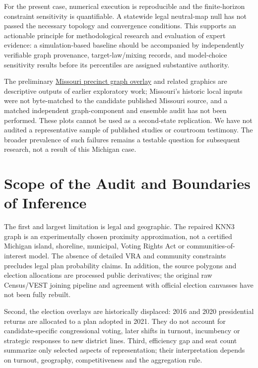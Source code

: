 \documentclass[
  10pt,
]{article}
\begin{document}
For the present case, numerical execution is reproducible and the
finite-horizon constraint sensitivity is quantifiable. A statewide legal
neutral-map null has not passed the necessary topology and convergence
conditions. This supports an actionable principle for methodological
research and evaluation of expert evidence: a simulation-based baseline
should be accompanied by independently verifiable graph provenance,
target-law/mixing records, and model-choice sensitivity results before
its percentiles are assigned substantive authority.

The preliminary
\href{https://github.com/DjokovicMan22/Gerrymandering-Project/blob/research/stages-1-3-validation/outputs/figures/week1/mo_precinct_dual_graph_overlay.png}{Missouri
precinct graph overlay} and related graphics are descriptive outputs of
earlier exploratory work; Missouri's historic local inputs were not
byte-matched to the candidate published Missouri source, and a matched
independent graph-component and ensemble audit has not been performed.
These plots cannot be used as a second-state replication. We have not
audited a representative sample of published studies or courtroom
testimony. The broader prevalence of such failures remains a testable
question for subsequent research, not a result of this Michigan case.

\hypertarget{scope-of-the-audit-and-boundaries-of-inference}{%
\section{Scope of the Audit and Boundaries of
Inference}\label{scope-of-the-audit-and-boundaries-of-inference}}

The first and largest limitation is legal and geographic. The repaired
KNN3 graph is an experimentally chosen proximity approximation, not a
certified Michigan island, shoreline, municipal, Voting Rights Act or
communities-of-interest model. The absence of detailed VRA and community
constraints precludes legal plan probability claims. In addition, the
source polygons and election allocations are processed public
derivatives; the original raw Census/VEST joining pipeline and agreement
with official election canvasses have not been fully rebuilt.

Second, the election overlays are historically displaced: 2016 and 2020
presidential returns are allocated to a plan adopted in 2021. They do
not account for candidate-specific congressional voting, later shifts in
turnout, incumbency or strategic responses to new district lines. Third,
efficiency gap and seat count summarize only selected aspects of
representation; their interpretation depends on turnout, geography,
competitiveness and the aggregation rule.
\end{document}
